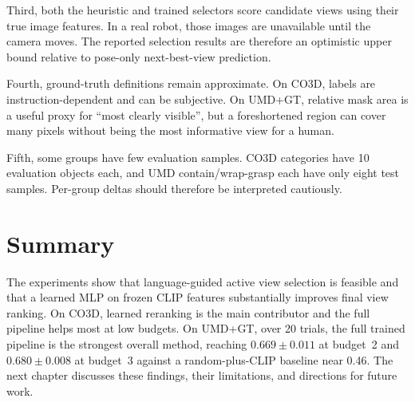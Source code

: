 Third, both the heuristic and trained selectors score candidate views using their true image features. In a real robot, those images are unavailable until the camera moves. The reported selection results are therefore an optimistic upper bound relative to pose-only next-best-view prediction.

Fourth, ground-truth definitions remain approximate. On CO3D, labels are instruction-dependent and can be subjective. On UMD+GT, relative mask area is a useful proxy for ``most clearly visible'', but a foreshortened region can cover many pixels without being the most informative view for a human.

Fifth, some groups have few evaluation samples. CO3D categories have 10 evaluation objects each, and UMD contain/wrap-grasp each have only eight test samples. Per-group deltas should therefore be interpreted cautiously.

\section{Summary}

The experiments show that language-guided active view selection is feasible and that a learned MLP on frozen CLIP features substantially improves final view ranking.
On CO3D, learned reranking is the main contributor and the full pipeline helps most at low budgets.
On UMD+GT, over 20 trials, the full trained pipeline is the strongest overall method, reaching \(0.669 \pm 0.011\) at budget~2 and \(0.680 \pm 0.008\) at budget~3 against a random-plus-CLIP baseline near 0.46.
The next chapter discusses these findings, their limitations, and directions for future work.
